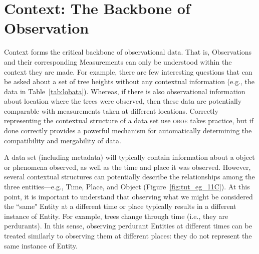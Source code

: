 \documentclass[article,oneside]{memoir}
\newcommand{\obs}{\textsc{oboe}}
\begin{document}
\pagebreak
\section{Context: The Backbone of Observation}

Context forms the critical backbone of observational data.  That is,
Observations and their corresponding Measurements can only be
understood within the context they are made.  For example, there are
few interesting questions that can be asked about a set of tree
heights without any contextual information (e.g., the data in
Table~\ref{tab:lobata}).  Whereas, if there is also observational
information about location where the trees were observed, then these
data are potentially comparable with measurements taken at different
locations.  Correctly representing the contextual structure of a data
set use \obs{} takes practice, but if done correctly provides a
powerful mechanism for automatically determining the compatibility and
mergability of data.

A data set (including metadata) will typically contain information
about a object or phenomena observed, as well as the time and place it
was observed.  However, several contextual structures can potentially
describe the relationships among the three entities---e.g., Time,
Place, and Object (Figure~\ref{fig:tut_eg_11C}).  At this point, it is
important to understand that observing what we might be considered the
``same" Entity at a different time or place typically results in a
different instance of Entity.  For example, trees change through time
(i.e., they are perdurants).  In this sense, observing perdurant
Entities at different times can be treated similarly to observing them
at different places: they do not represent the same instance of
Entity.
\end{document}
